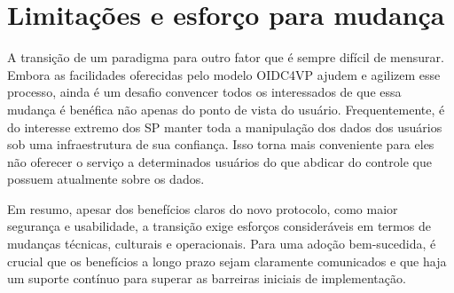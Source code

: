 \clearpage
\section{Limitações e esforço para mudança}\label{section:limitacoes-esforco}

A transição de um paradigma para outro fator que é sempre difícil de mensurar. Embora as facilidades oferecidas pelo modelo \acs{OIDC4VP} ajudem e agilizem esse processo, ainda é um desafio convencer todos os interessados de que essa mudança é benéfica não apenas do ponto de vista do usuário. Frequentemente, é do interesse extremo dos \acs{SP} manter toda a manipulação dos dados dos usuários sob uma infraestrutura de sua confiança. Isso torna mais conveniente para eles não oferecer o serviço a determinados usuários do que abdicar do controle que possuem atualmente sobre os dados.

Em resumo, apesar dos benefícios claros do novo protocolo, como maior segurança e usabilidade, a transição exige esforços consideráveis em termos de mudanças técnicas, culturais e operacionais. Para uma adoção bem-sucedida, é crucial que os benefícios a longo prazo sejam claramente comunicados e que haja um suporte contínuo para superar as barreiras iniciais de implementação.